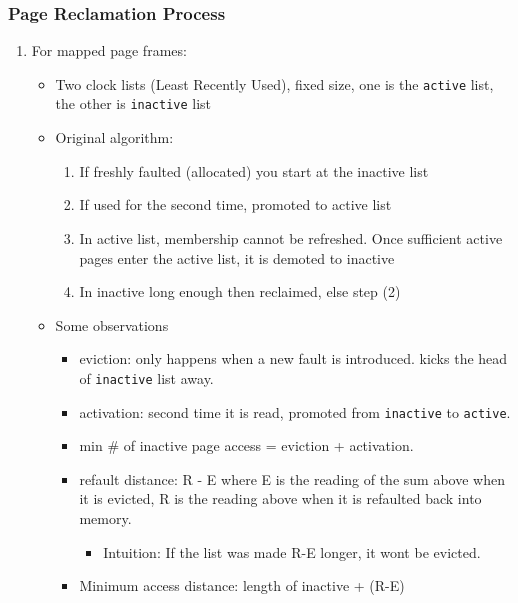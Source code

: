 \documentclass[11pt]{article}
\begin{document}
\subsubsection{Page Reclamation Process}
\label{sec:org898d280}
\begin{enumerate}
\item For mapped page frames:
\label{sec:org87859ee}
\begin{itemize}
\item Two clock lists (Least Recently Used), fixed size, one is the \texttt{active} list,
the other is \texttt{inactive} list
\item Original algorithm:
\begin{enumerate}
\item If freshly faulted (allocated) you start at the inactive list
\item If used for the second time, promoted to active list
\item In active list, membership cannot be refreshed. Once sufficient active
pages enter the active list, it is demoted to inactive
\item In inactive long enough then reclaimed, else step (2)
\end{enumerate}
\item Some observations
\begin{itemize}
\item eviction: only happens when a new fault is introduced. kicks the head of
\texttt{inactive} list away.
\item activation: second time it is read, promoted from \texttt{inactive} to \texttt{active}.
\item min \# of inactive page access  = eviction + activation.
\item refault distance: R - E where E is the reading of the sum above when it is
evicted, R is the reading above when it is refaulted back into memory.
\begin{itemize}
\item Intuition: If the list was made R-E longer, it wont be evicted.
\end{itemize}
\item Minimum access distance: length of inactive + (R-E)
\end{itemize}
\end{itemize}
\end{enumerate}
\end{document}
